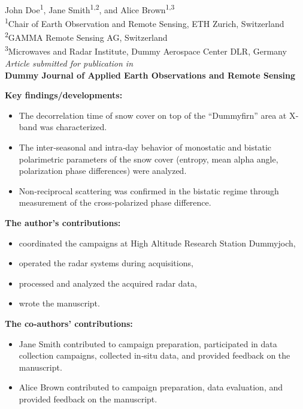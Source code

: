 \begin{refsection}

    \begin{center}
        John Doe\textsuperscript{1}, Jane Smith\textsuperscript{1,2}, and Alice Brown\textsuperscript{1,3}\\[0.75em]
        {\footnotesize
        \textsuperscript{1}Chair of Earth Observation and Remote Sensing, ETH Zurich, Switzerland\\
        \textsuperscript{2}GAMMA Remote Sensing AG, Switzerland\\
        \textsuperscript{3}Microwaves and Radar Institute, Dummy Aerospace Center DLR, Germany
        }\\[1em]
        \textit{Article submitted for publication in}\\
        \textbf{Dummy Journal of Applied Earth Observations and Remote Sensing}
    \end{center}
    
    \noindent
    \textbf{Key findings/developments:}
    \begin{itemize}
      \item The decorrelation time of snow cover on top of the “Dummyfirn” area at X‐band was characterized.
      \item The inter‐seasonal and intra‐day behavior of monostatic and bistatic polarimetric parameters of the snow cover (entropy, mean alpha angle, polarization phase differences) were analyzed.
      \item Non‐reciprocal scattering was confirmed in the bistatic regime through measurement of the cross‐polarized phase difference.
    \end{itemize}
    
    \vspace{1em}
    \noindent
    \textbf{The author’s contributions:}
    \begin{itemize}
      \item coordinated the campaigns at High Altitude Research Station Dummyjoch,
      \item operated the radar systems during acquisitions,
      \item processed and analyzed the acquired radar data,
      \item wrote the manuscript.
    \end{itemize}
    
    \vspace{1em}
    \noindent
    \textbf{The co‐authors’ contributions:}
    \begin{itemize}
      \item Jane Smith contributed to campaign preparation, participated in data collection campaigns, collected in‐situ data, and provided feedback on the manuscript.
      \item Alice Brown contributed to campaign preparation, data evaluation, and provided feedback on the manuscript.
    \end{itemize}
    

\end{refsection}

